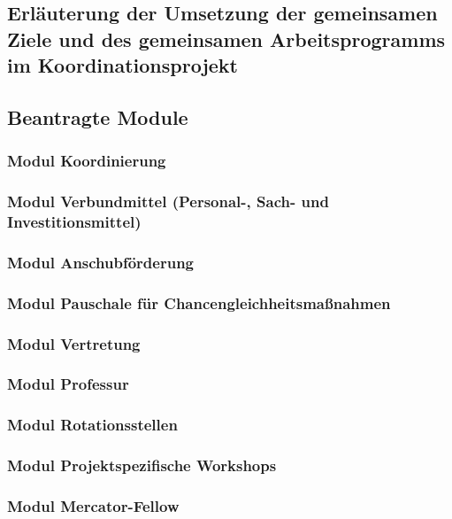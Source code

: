 \documentclass[german, 53.02]{proposal}
\begin{document}
\subsection{Erläuterung der Umsetzung der gemeinsamen Ziele und des gemeinsamen Arbeitsprogramms im Koordinationsprojekt}

\subsection{Beantragte Module}

\subsubsection{Modul Koordinierung}

\subsubsection{Modul Verbundmittel (Personal-, Sach- und Investitionsmittel)}

\subsubsection{Modul Anschubförderung}

\subsubsection{Modul Pauschale für Chancengleichheitsmaßnahmen}

\subsubsection{Modul Vertretung}

\subsubsection{Modul Professur}

\subsubsection{Modul Rotationsstellen}

\subsubsection{Modul Projektspezifische Workshops}

\subsubsection{Modul Mercator-Fellow}
\end{document}
